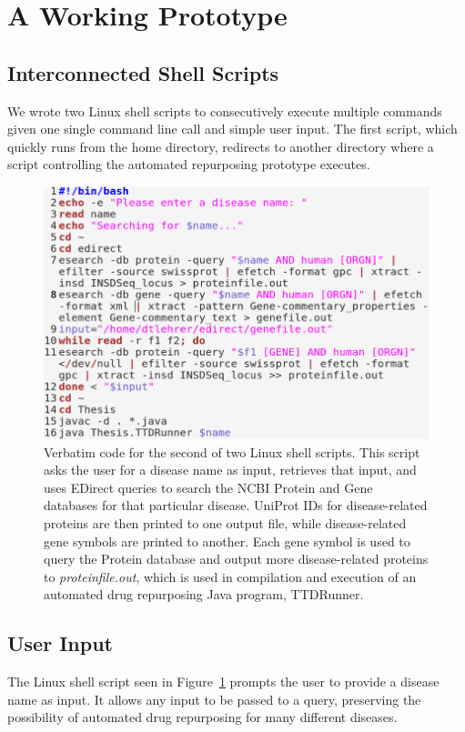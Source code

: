\documentclass{IEEEtran}
\begin{document}
	\section{A Working Prototype}
	\subsection{Interconnected Shell Scripts}
	We wrote two Linux shell scripts to consecutively execute multiple commands given one single command line call and simple user input. The first script, which quickly runs from the home directory, redirects to another directory where a script controlling the automated repurposing prototype executes.
	\begin{figure}[h]
		\centering
		\includegraphics[width=\linewidth]{newscript}
		\caption{\footnotesize Verbatim code for the second of two Linux shell scripts.  This script asks the user for a disease name as input, retrieves that input, and uses EDirect queries to search the NCBI Protein and Gene databases for that particular disease.  UniProt IDs for disease-related proteins are then printed to one output file, while disease-related gene symbols are printed to another.  Each gene symbol is used to query the Protein database and output more disease-related proteins to \textit{proteinfile.out}, which is used in compilation and execution of an automated drug repurposing Java program, TTDRunner.}
		\label{linuxscript}
	\end{figure}
	\subsection{User Input}
	The Linux shell script seen in Figure~\ref{linuxscript} prompts the user to provide a disease name as input. It allows any input to be passed to a query, preserving the possibility of automated drug repurposing for many different diseases.
\end{document}
